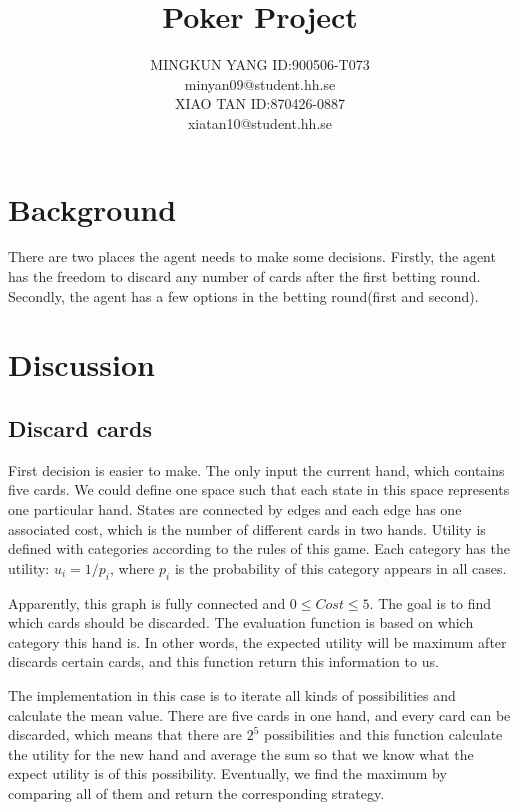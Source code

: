 \documentclass{report}
\begin{document}
\title{Poker Project}
\author{MINGKUN YANG ID:900506-T073\\
minyan09@student.hh.se\\
XIAO TAN ID:870426-0887\\
xiatan10@student.hh.se\\
}
\maketitle 

\section{Background}
There are two places the agent needs to make some decisions. Firstly, the agent has the freedom to discard any number of cards after the first 
betting round. Secondly, the agent has a few options in the betting round(first and second).

\section{Discussion}
\subsection{Discard cards}
First decision is easier to make. The only input the current hand, which contains five cards. We could define one space such that each state in this 
space represents one particular hand. States are connected by edges and each edge has one associated cost, which is the number of different cards in 
two hands. Utility is defined with categories according to the rules of this game. Each category has the utility: $u_i = 1/p_i$, where $p_i$ is the 
probability of this category appears in all cases.

Apparently, this graph is fully connected and $0 \le Cost \le 5$. The goal is to find which cards should be discarded. The evaluation function is 
based on which category this hand is. In other words, the expected utility will be maximum after discards certain cards, and this function return this
information to us.

The implementation in this case is to iterate all kinds of possibilities and calculate the mean value. There are five cards in one hand, and every 
card can be discarded, which means that there are $2^5$ possibilities and this function calculate the utility for the new hand and average the sum so 
that we know what the expect utility is of this possibility. Eventually, we find the maximum by comparing all of them and return the corresponding 
strategy.
\end{document}
